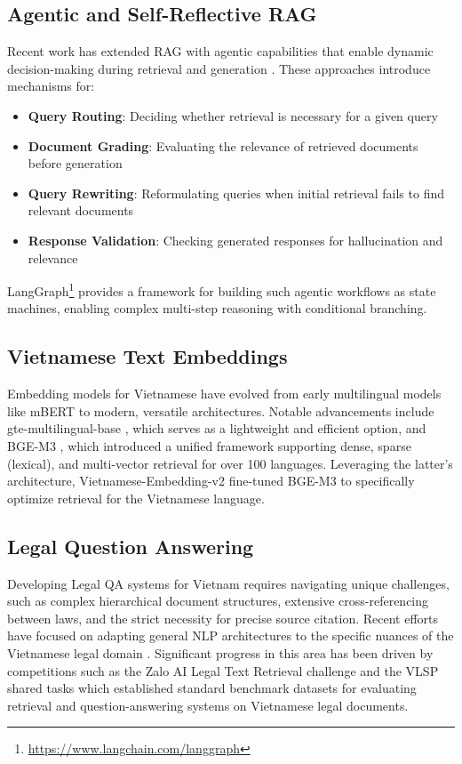 \documentclass[letterpaper]{article} %
\begin{document}
\subsection{Agentic and Self-Reflective RAG}

Recent work has extended RAG with agentic capabilities that enable dynamic decision-making during retrieval and generation \cite{asai2023selfraglearningretrievegenerate, yan2024correctiveretrievalaugmentedgeneration}. These approaches introduce mechanisms for:
\begin{itemize}
	\item \textbf{Query Routing}: Deciding whether retrieval is necessary for a given query 
	\item \textbf{Document Grading}: Evaluating the relevance of retrieved documents before generation
	\item \textbf{Query Rewriting}: Reformulating queries when initial retrieval fails to find relevant documents
	\item \textbf{Response Validation}: Checking generated responses for hallucination and relevance
\end{itemize}

LangGraph\footnote{\url{https://www.langchain.com/langgraph}} provides a framework for building such agentic workflows as state machines, enabling complex multi-step reasoning with conditional branching.

\subsection{Vietnamese Text Embeddings}

Embedding models for Vietnamese have evolved from early multilingual models like mBERT to modern, versatile architectures. Notable advancements include gte-multilingual-base \cite{zhang2024mgte}, which serves as a lightweight and efficient option, and BGE-M3 \cite{bge-m3}, which introduced a unified framework supporting dense, sparse (lexical), and multi-vector retrieval for over 100 languages. Leveraging the latter's architecture, Vietnamese-Embedding-v2 \cite{Vietnamese_Embedding} fine-tuned BGE-M3 to specifically optimize retrieval for the Vietnamese language.

\subsection{Legal Question Answering}

Developing Legal QA systems for Vietnam requires navigating unique challenges, such as complex hierarchical document structures, extensive cross-referencing between laws, and the strict necessity for precise source citation. Recent efforts have focused on adapting general NLP architectures to the specific nuances of the Vietnamese legal domain \cite{duong2014vietnameselegalqa,ba2024vietnameselegalinformationretrieval}. Significant progress in this area has been driven by competitions such as the Zalo AI Legal Text Retrieval challenge and the VLSP shared tasks which established standard benchmark datasets for evaluating retrieval and question-answering systems on Vietnamese legal documents.
\end{document}
